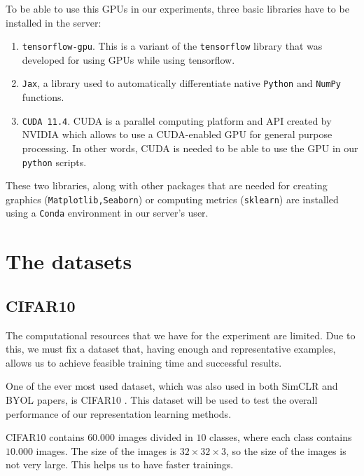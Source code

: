 

To be able to use this GPUs in our experiments, three basic libraries have to be installed in the server:
\begin{enumerate}
\item \lstinline{tensorflow-gpu}. This is a variant of the \lstinline{tensorflow} library that was developed for using GPUs while using tensorflow.
\item \lstinline{Jax}, a library used to automatically differentiate native \lstinline{Python} and \lstinline{NumPy} functions.
\item \lstinline{CUDA 11.4}. CUDA is a parallel computing platform and API created by NVIDIA which allows to use a CUDA-enabled GPU for general purpose processing. In other words, CUDA is needed to be able to use the GPU in our \lstinline{python} scripts.
\end{enumerate}

These two libraries, along with other packages that are needed for creating graphics (\lstinline{Matplotlib,Seaborn}) or computing metrics (\lstinline{sklearn}) are installed using a \lstinline{Conda} environment in our server's user.


\section{The datasets}

\subsection{CIFAR10}

The computational resources that we have for the experiment are limited. Due to this, we must fix a dataset that, having enough and representative examples, allows us to achieve feasible training time and successful results.

One of the ever most used dataset, which was also used in both SimCLR and BYOL papers, is CIFAR10 \citep{krizhevsky_learning_nodate}. This dataset will be used to test the overall performance of our representation learning methods.

CIFAR10 contains $60.000$ images divided in $10$ classes, where each class contains $10.000$ images. The size of the images is $32\times 32\times 3$, so the size of the images is not very large. This helps us to have faster trainings.

